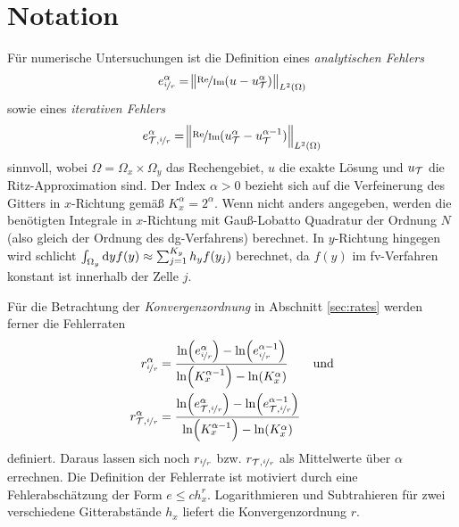 \section{Notation}\label{sec:notation_4}
Für numerische Untersuchungen ist die Definition eines \emph{analytischen Fehlers} 
\begin{equation}
  e_{\nicefrac{i}{r}}^{\alpha} = \norm{\nicefrac{\operatorname{Re}}{\operatorname{Im}} (u - u_{\mathcal{T}}^{\alpha})}_{L^2(\Omega)}
\end{equation}
sowie eines \emph{iterativen Fehlers}
\begin{equation}
  e_{\mathcal{T}, \nicefrac{i}{r}}^{\alpha} = \norm{\nicefrac{\operatorname{Re}}{\operatorname{Im}} (u_{\mathcal{T}}^{\alpha} - u_{\mathcal{T}}^{\alpha-1})}_{L^2(\Omega)}
\end{equation}
sinnvoll, wobei $\Omega=\Omega_x \times \Omega_y$ das Rechengebiet, $u$ die exakte Lösung und $u_{\mathcal{T}}$ die Ritz-Approximation sind. Der Index $\alpha>0$ bezieht sich auf die Verfeinerung des Gitters in $x$-Richtung gemäß $K_x^{\alpha} = 2^\alpha$. Wenn nicht anders angegeben, werden die benötigten Integrale in $x$-Richtung mit Gauß-Lobatto Quadratur der Ordnung $N$ (also gleich der Ordnung des \ac{dg}-Verfahrens) berechnet.
In $y$-Richtung hingegen wird schlicht $\int_{\Omega_y}\mathop{}\!\mathrm{d} y f(y) \approx \sum_{j=1}^{K_y} h_y f(y_j)$ berechnet, da $f(y)$ im \ac{fv}-Verfahren konstant ist innerhalb der Zelle $j$.

Für die Betrachtung der \emph{Konvergenzordnung} in Abschnitt \ref{sec:rates} werden ferner die Fehlerraten
\begin{align}
  r_{\nicefrac{i}{r}}^{\alpha} &= \frac{\ln(e_{\nicefrac{i}{r}}^{\alpha}) - \ln(e_{\nicefrac{i}{r}}^{\alpha-1})}{\ln(K_x^{\alpha-1}) - \ln(K_x^{\alpha})} \qquad\text{und}\\
  r_{\mathcal{T},\nicefrac{i}{r}}^{\alpha} &= \frac{\ln(e_{\mathcal{T},\nicefrac{i}{r}}^{\alpha}) - \ln(e_{\mathcal{T},\nicefrac{i}{r}}^{\alpha-1})}{\ln(K_x^{\alpha-1}) - \ln(K_x^{\alpha})}
\end{align}
definiert. Daraus lassen sich noch $r_{\nicefrac{i}{r}}$ bzw. $r_{\mathcal{T},\nicefrac{i}{r}}$ als Mittelwerte über $\alpha$ errechnen. Die Definition der Fehlerrate ist motiviert durch eine Fehlerabschätzung der Form $e \leq ch_x^r$. Logarithmieren und Subtrahieren für zwei verschiedene Gitterabstände $h_x$ liefert die Konvergenzordnung $r$.

